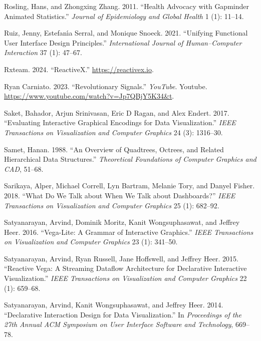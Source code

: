 \documentclass[
  openany]{book}
\newlength{\cslhangindent}
\newenvironment{CSLReferences}[2] %
 {\begin{list}{}{%
  \setlength{\itemindent}{0pt}
  \setlength{\leftmargin}{0pt}
  \setlength{\parsep}{0pt}
  \ifodd #1
   \setlength{\leftmargin}{\cslhangindent}
   \setlength{\itemindent}{-1\cslhangindent}
  \fi
  \setlength{\itemsep}{#2\baselineskip}}}
 {\end{list}}
\theoremstyle{definition}
\theoremstyle{definition}
\theoremstyle{definition}
\theoremstyle{definition}
\theoremstyle{remark}
\begin{document}
\begin{CSLReferences}{1}{0}
Rosling, Hans, and Zhongxing Zhang. 2011. {``Health Advocacy with Gapminder Animated Statistics.''} \emph{Journal of Epidemiology and Global Health} 1 (1): 11--14.

Ruiz, Jenny, Estefanı́a Serral, and Monique Snoeck. 2021. {``Unifying Functional User Interface Design Principles.''} \emph{International Journal of Human--Computer Interaction} 37 (1): 47--67.

Rxteam. 2024. {``{ReactiveX}.''} \url{https://reactivex.io}.

Ryan Carniato. 2023. {``{Revolutionary Signals}.''} \emph{YouTube}. Youtube. \url{https://www.youtube.com/watch?v=Jp7QBjY5K34&t}.

Saket, Bahador, Arjun Srinivasan, Eric D Ragan, and Alex Endert. 2017. {``Evaluating Interactive Graphical Encodings for Data Visualization.''} \emph{IEEE Transactions on Visualization and Computer Graphics} 24 (3): 1316--30.

Samet, Hanan. 1988. {``An Overview of Quadtrees, Octrees, and Related Hierarchical Data Structures.''} \emph{Theoretical Foundations of Computer Graphics and CAD}, 51--68.

Sarikaya, Alper, Michael Correll, Lyn Bartram, Melanie Tory, and Danyel Fisher. 2018. {``What Do We Talk about When We Talk about Dashboards?''} \emph{IEEE Transactions on Visualization and Computer Graphics} 25 (1): 682--92.

Satyanarayan, Arvind, Dominik Moritz, Kanit Wongsuphasawat, and Jeffrey Heer. 2016. {``Vega-Lite: A Grammar of Interactive Graphics.''} \emph{IEEE Transactions on Visualization and Computer Graphics} 23 (1): 341--50.

Satyanarayan, Arvind, Ryan Russell, Jane Hoffswell, and Jeffrey Heer. 2015. {``Reactive Vega: A Streaming Dataflow Architecture for Declarative Interactive Visualization.''} \emph{IEEE Transactions on Visualization and Computer Graphics} 22 (1): 659--68.

Satyanarayan, Arvind, Kanit Wongsuphasawat, and Jeffrey Heer. 2014. {``Declarative Interaction Design for Data Visualization.''} In \emph{Proceedings of the 27th Annual ACM Symposium on User Interface Software and Technology}, 669--78.


\end{CSLReferences}
\end{document}
